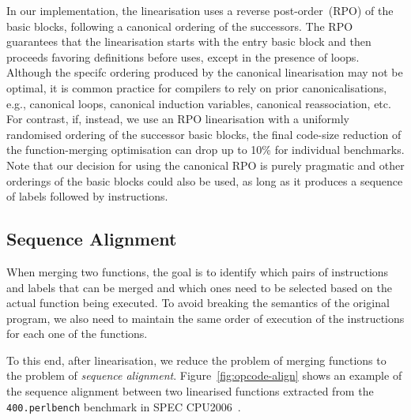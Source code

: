 In our implementation, the linearisation uses a reverse post-order~(RPO) of the
basic blocks, following a canonical ordering of the successors.
The RPO guarantees that the linearisation starts with the entry basic block and
then proceeds favoring definitions before uses, except in the presence of loops.
Although the specifc ordering produced by the canonical linearisation may not
be optimal, it is common practice for compilers to rely on prior
canonicalisations, e.g., 
canonical loops, canonical induction variables, canonical reassociation, etc.
For contrast, if, instead, we use an RPO linearisation with a uniformly
randomised ordering of the successor basic blocks, the final code-size reduction
of the function-merging optimisation can drop up to 10\% for individual
benchmarks.
Note that our decision for using the canonical RPO is purely pragmatic and
other orderings of the basic blocks could also be used, as long as it produces
a sequence of labels followed by instructions.


\subsection{Sequence Alignment}

When merging two functions, the goal is to identify which pairs of instructions and labels that can be merged and which ones need to be selected based on the actual function being executed.
To avoid breaking the semantics of the original program, we also need to maintain the same order of execution of the instructions for each one of the functions.

To this end, after linearisation, we reduce the problem of merging functions to the problem of \textit{sequence alignment}.
Figure~\ref{fig:opcode-align} shows an example of the sequence alignment between two linearised functions extracted from the \texttt{400.perlbench} benchmark in SPEC CPU2006~\cite{spec}.

